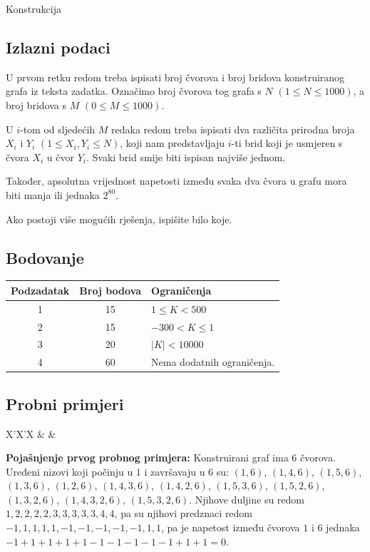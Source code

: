 \begin{statement}[
  problempoints=110,
  timelimit=1 sekunda,
  memorylimit=512 MiB,
]{Konstrukcija}
\subsection*{Izlazni podaci}
U prvom retku redom treba ispisati broj čvorova i broj bridova konstruiranog
grafa iz teksta zadatka. Označimo broj čvorova tog grafa s $N$ $(1 \le N \le
1000)$, a broj bridova s $M$ $(0 \le M \le 1000)$.

U $i$-tom od sljedećih $M$ redaka redom treba ispisati dva različita prirodna
broja $X_i$ i $Y_i$ $(1 \le X_i, Y_i \le N)$, koji nam predstavljaju $i$-ti
brid koji je usmjeren s čvora $X_i$ u čvor $Y_i$. Svaki brid smije biti
ispisan najviše jednom.

Također, apsolutna vrijednost napetosti između svaka dva čvora u grafu mora
biti manja ili jednaka $2^{80}$.

Ako postoji više mogućih rješenja, ispišite bilo koje.

\subsection*{Bodovanje}
{\renewcommand{\arraystretch}{1.4}
  \setlength{\tabcolsep}{6pt}
  \begin{tabular}{ccl}
 Podzadatak & Broj bodova & Ograničenja \\ \midrule
  1 & 15 & $1 \le K < 500$ \\
  2 & 15 & $-300 < K \le 1$ \\
  3 & 20 & $|K| < 10000$\\
  4 & 60 & Nema dodatnih ograničenja. \\
\end{tabular}}

\subsection*{Probni primjeri}
\begin{tabularx}{\textwidth}{X'X'X}
 &
 &
\end{tabularx}

\textbf{Pojašnjenje prvog probnog primjera:}
Konstruirani graf ima $6$ čvorova. Uređeni nizovi koji počinju u $1$ i
završavaju u $6$ su: $(1, 6)$, $(1, 4, 6)$, $(1, 5, 6)$, $(1, 3, 6)$, $(1, 2,
6)$, $(1, 4, 3, 6)$, $(1, 4, 2, 6)$, $(1, 5, 3, 6)$, $(1, 5, 2, 6)$, $(1, 3, 2,
6)$, $(1, 4, 3, 2, 6)$, $(1, 5, 3, 2, 6)$.  Njihove duljine su redom $1, 2, 2,
2, 2, 3, 3, 3, 3, 3, 4, 4$, pa su njihovi predznaci redom $-1, 1, 1, 1, 1, -1,
-1, -1, -1, -1, 1, 1$, pa je napetost između čvorova $1$ i $6$ jednaka $-1 + 1
+ 1 + 1 + 1 - 1 - 1 - 1 - 1 - 1 + 1 + 1 = 0$.


\end{statement}
